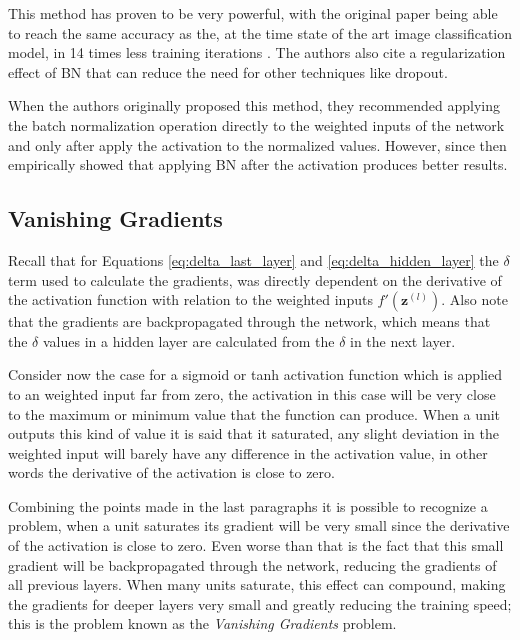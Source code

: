 This method has proven to be very powerful, with the original paper being able to reach the same accuracy as the, at the time state of the art image classification model, in 14 times less training iterations \cite{batchnorm2015}. The authors also cite a regularization effect of \gls{BN} that can reduce the need for other techniques like dropout.

When the authors originally proposed this method, they recommended applying the batch normalization operation directly to the weighted inputs of the network and only after apply the activation to the normalized values. However, since then \textcite{CaffeNetBench2017} empirically showed that applying \gls{BN} after the activation produces better results.

\subsection{Vanishing Gradients} \label{sub:vanishing_gradients}
Recall that for Equations \ref{eq:delta_last_layer} and \ref{eq:delta_hidden_layer} the $\delta$ term used to calculate the gradients, was directly dependent on the derivative of the activation function with relation to the weighted inputs $f'(\bm{z}^{(l)})$. Also note that the gradients are backpropagated through the network, which means that the $\delta$ values in a hidden layer are calculated from the $\delta$ in the next layer.

Consider now the case for a sigmoid or \gls{tanh} activation function which is applied to an weighted input far from zero, the activation in this case will be very close to the maximum or minimum value that the function can produce. When a unit outputs this kind of value it is said that it saturated, any slight deviation in the weighted input will barely have any difference in the activation value, in other words the derivative of the activation is close to zero.

Combining the points made in the last paragraphs it is possible to recognize a problem, when a unit saturates its gradient will be very small since the derivative of the activation is close to zero. Even worse than that is the fact that this small gradient will be backpropagated through the network, reducing the gradients of all previous layers. When many units saturate, this effect can compound, making the gradients for deeper layers very small and greatly reducing the training speed; this is the problem known as the \textit{Vanishing Gradients} problem.

